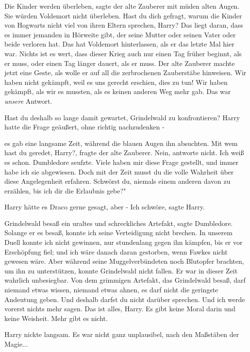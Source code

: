\glqq{}Die Kinder werden überleben\grqq{}, sagte der alte Zauberer mit müden
alten Augen. \glqq{}Sie würden Voldemort nicht überleben. Hast du dich gefragt,
warum die Kinder von Hogwarts nicht viel von ihren Eltern sprechen, Harry? Das
liegt daran, dass es immer jemanden in Hörweite gibt, der seine Mutter oder
seinen Vater oder beide verloren hat. Das hat Voldemort hinterlassen, als er das
letzte Mal hier war. Nichts ist es wert, dass dieser Krieg auch nur einen Tag
früher beginnt, als er muss, oder einen Tag länger dauert, als er muss.\grqq{}
Der alte Zauberer machte jetzt eine Geste, als wolle er auf all die zerbrochenen
Zauberstäbe hinweisen. \glqq{}Wir haben nicht gekämpft, weil es uns gerecht
erschien, dies zu tun! Wir haben gekämpft, als wir es mussten, als es keinen
anderen Weg mehr gab. Das war \emph{unsere} Antwort.\grqq{}

\glqq{}Hast du deshalb so lange damit gewartet, Grindelwald zu
konfrontieren?\grqq{} Harry hatte die Frage geäußert, ohne richtig nachzudenken
-

es gab eine langsame Zeit, während die blauen Augen ihn absuchten. \glqq{}Mit wem
hast du geredet, Harry?\grqq{}, fragte der alte Zauberer. \glqq{}Nein, antworte
nicht. Ich weiß es schon.\grqq{} Dumbledore seufzte. \glqq{}Viele haben mir diese
Frage gestellt, und immer habe ich sie abgewiesen. Doch mit der Zeit musst du
die volle Wahrheit über diese Angelegenheit erfahren. Schwörst du, niemals einem
anderen davon zu erzählen, bis ich dir die Erlaubnis gebe?"

Harry hätte es Draco gerne gesagt, aber - \glqq{}Ich schwöre\grqq{}, sagte Harry.

\glqq{}Grindelwald besaß ein uraltes und schreckliches Artefakt\grqq{}, sagte
Dumbledore. \glqq{}Solange er es besaß, konnte ich seine Verteidigung nicht
brechen. In unserem Duell konnte ich nicht gewinnen, nur stundenlang gegen ihn
kämpfen, bis er vor Erschöpfung fiel; und ich wäre danach daran gestorben, wenn
Fawkes nicht gewesen wäre. Aber während seine Muggelverbündeten noch Blutopfer
brachten, um ihn zu unterstützen, konnte Grindelwald nicht fallen. Er war in
dieser Zeit wahrlich unbesiegbar. Von dem grimmigen Artefakt, das Grindelwald
besaß, darf niemand etwas wissen, niemand etwas ahnen, es darf nicht die
geringste Andeutung geben. Und deshalb darfst du nicht darüber sprechen. Und ich
werde vorerst nichts mehr sagen. Das ist alles, Harry. Es gibt keine Moral darin
und keine Weisheit. Mehr gibt es nicht.\grqq{}

Harry nickte langsam. Es war nicht ganz unplausibel, nach den Maßstäben der
Magie...

